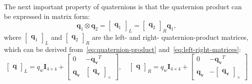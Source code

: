 The next important property of quaternions is that the quaternion product can be expressed in matrix form:
\begin{equation}
    \mathbf{q}_1\otimes\mathbf{q}_2=\begin{bmatrix}\mathbf{q}_1\end{bmatrix}_L=\begin{bmatrix}\mathbf{q}_2\end{bmatrix}_R\mathbf{q}_1,
    \label{eq:left-right-matrices}
\end{equation}
where $\begin{bmatrix}\mathbf{q}_1\end{bmatrix}_L$ and $\begin{bmatrix}\mathbf{q}_2\end{bmatrix}_R$ are the left- and right- quaternion-product matrices, which can be derived from~\eqref{eq:quaternion-product} and~\eqref{eq:left-right-matrices}:
\begin{equation}
    \begin{bmatrix}\mathbf{q}\end{bmatrix}_L=q_w\mathbf{I}_{4\times 4}+
    \begin{bmatrix}
        0 & -\mathbf{q_v}^T \\
        \mathbf{q_v} & \begin{bmatrix}\mathbf{q_v}\end{bmatrix}_\times
    \end{bmatrix}, \quad
    \begin{bmatrix}\mathbf{q}\end{bmatrix}_R=q_w\mathbf{I}_{4\times 4}+
    \begin{bmatrix}
    0 & -\mathbf{q_v}^T \\
    \mathbf{q_v} & -\begin{bmatrix}\mathbf{q_v}\end{bmatrix}_\times
    \end{bmatrix}
    \label{eq:left-right-mat-def}
\end{equation}

